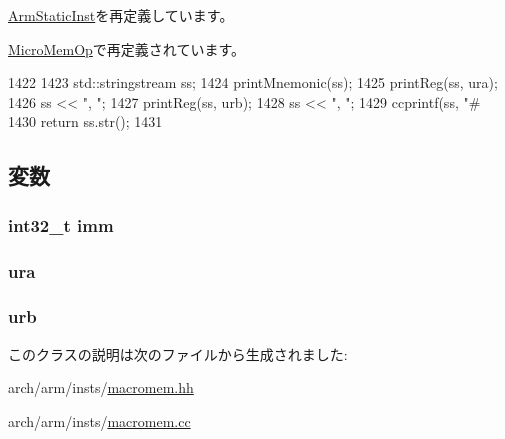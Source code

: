 \hyperlink{classArmISA_1_1ArmStaticInst_a95d323a22a5f07e14d6b4c9385a91896}{ArmStaticInst}を再定義しています。

\hyperlink{classArmISA_1_1MicroMemOp_a95d323a22a5f07e14d6b4c9385a91896}{MicroMemOp}で再定義されています。


\begin{DoxyCode}
1422 {
1423     std::stringstream ss;
1424     printMnemonic(ss);
1425     printReg(ss, ura);
1426     ss << ", ";
1427     printReg(ss, urb);
1428     ss << ", ";
1429     ccprintf(ss, "#%
1430     return ss.str();
1431 }
\end{DoxyCode}


\subsection{変数}
\hypertarget{classArmISA_1_1MicroIntImmOp_a71f011dbd3228d41f9e08aaf8c133f77}{
\subsubsection[{imm}]{\setlength{\rightskip}{0pt plus 5cm}int32\_\-t {\bf imm}}}
\label{classArmISA_1_1MicroIntImmOp_a71f011dbd3228d41f9e08aaf8c133f77}
\hypertarget{classArmISA_1_1MicroIntImmOp_a8e6cd3e234a4950e7a1a05f1b24cfee0}{
\subsubsection[{ura}]{ {\bf ura}}}
\label{classArmISA_1_1MicroIntImmOp_a8e6cd3e234a4950e7a1a05f1b24cfee0}
\hypertarget{classArmISA_1_1MicroIntImmOp_a3771d4e6da84a09dbf436d6b1af2be46}{
\subsubsection[{urb}]{ {\bf urb}}}
\label{classArmISA_1_1MicroIntImmOp_a3771d4e6da84a09dbf436d6b1af2be46}


このクラスの説明は次のファイルから生成されました:\begin{DoxyCompactItemize}
\item 
arch/arm/insts/\hyperlink{macromem_8hh}{macromem.hh}\item 
arch/arm/insts/\hyperlink{macromem_8cc}{macromem.cc}\end{DoxyCompactItemize}
